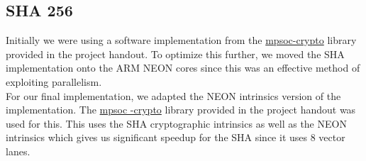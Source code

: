 \documentclass[../main.tex]{subfiles}
\begin{document}
\subsection{\textbf{SHA 256}}
Initially we were using a software implementation from the \href{https://github.com/james-ben/mpsoc-crypto}{mpsoc-crypto} library provided in the
project handout. To optimize this further, we moved the SHA implementation onto the ARM NEON cores since this was an effective method of exploiting
parallelism. \\
\newline
For our final implementation, we adapted the NEON intrinsics version of the implementation. The \href{https://github.com/james-ben/mpsoc-crypto}{mpsoc
-crypto} library provided in the project handout was used for this. This uses the SHA cryptographic intrinsics as well as the NEON intrinsics which
gives us significant speedup for the SHA since it uses 8 vector lanes.
\end{document}

